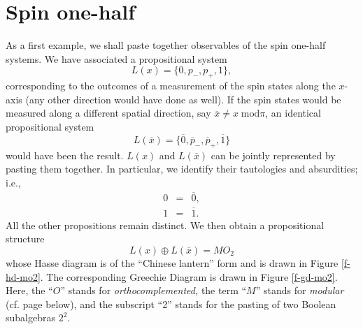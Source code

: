 \documentclass[%
  preprint,
 showpacs,
 showkeys,
 preprintnumbers,
 amsmath,amssymb,
 aps,
 rmp,
  longbibliography,
 ]{revtex4-1}
\begin{document}
\section{Spin one-half}
As a first example, we shall paste together observables of the spin
one-half systems.
We have associated a propositional system
$$L(x)= \{ 0, p_{-}, p_{+}, 1 \}, $$
corresponding to the outcomes of a measurement of the spin states
along the $x$-axis (any other direction would have done as well).
If the spin states would be measured along a different spatial
direction, say
$\overline{x}\neq x \; \textrm{mod} \pi$, an identical propositional
system
$$L(\overline x)= \{ \overline 0, \overline p_{-}, \overline p_{+},
\overline 1 \} $$
would have been the result.
$L(x)$ and
$L(\overline x)$ can be jointly represented by pasting them together.
In particular, we identify their tautologies and absurdities; i.e.,
\begin{eqnarray*}
0 &=& \overline 0,\\
1 &=& \overline 1.
\end{eqnarray*}
All the other propositions remain distinct.
We then obtain a propositional structure
$$L(x)\oplus L(\overline{x}) =
MO_2$$
whose Hasse diagram is of the ``Chinese lantern'' form and is drawn
in Figure \ref{f-hd-mo2}. The corresponding Greechie Diagram is drawn in
Figure \ref{f-gd-mo2}.
Here, the ``$O$'' stands for {\em orthocomplemented,} the term ``$M$''
stands for {\em modular} (cf. page
\pageref{l-modular} below),
and the subscript ``2'' stands for the pasting of
two Boolean subalgebras $2^2$.
\end{document}
